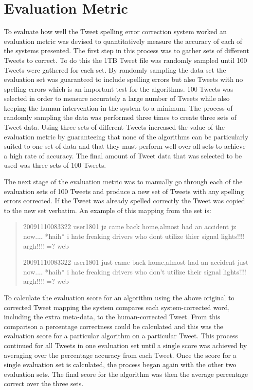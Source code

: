 \section{Evaluation Metric}

To evaluate how well the Tweet spelling error correction system worked an evaluation metric was devised to quantitatively measure the accuracy of each of the systems presented. The first step in this process was to gather sets of different Tweets to correct. To do this the 1TB Tweet file was randomly sampled until 100 Tweets were gathered for each set. By randomly sampling the data set the evaluation set was guaranteed to include spelling errors but also Tweets with no spelling errors which is an important test for the algorithms. 100 Tweets was selected in order to measure accurately a large number of Tweets while also keeping the human intervention in the system to a minimum. The process of randomly sampling the data was performed three times to create three sets of Tweet data. Using three sets of different Tweets increased the value of the evaluation metric by guaranteeing that none of the algorithms can be particularly suited to one set of data and that they must perform well over all sets to achieve a high rate of accuracy. The final amount of Tweet data that was selected to be used was three sets of 100 Tweets.

The next stage of the evaluation metric was to manually go through each of the evaluation sets of 100 Tweets and produce a new set of Tweets with any spelling errors corrected. If the Tweet was already spelled correctly the Tweet was copied to the new set verbatim. An example of this mapping from the set is:

\begin{quote}
20091110083322 user1801 jz came back home,almost had an accident jz now.... *haih* i hate freaking drivers who dont utilize thier signal lights!!!! argh!!!! =? web

20091110083322 user1801 just came back home,almost had an accident just now.... *haih* i hate freaking drivers who don't utilize their signal lights!!!! argh!!!! =? web
\end{quote}

To calculate the evaluation score for an algorithm using the above original to corrected Tweet mapping the system compares each system-corrected word, including the extra meta-data, to the human-corrected Tweet. From this comparison a percentage correctness could be calculated and this was the evaluation score for a particular algorithm on a particular Tweet. This process continued for all Tweets in one evaluation set until a single score was achieved by averaging over the percentage accuracy from each Tweet. Once the score for a single evaluation set is calculated, the process began again with the other two evaluation sets. The final score for the algorithm was then the average percentage correct over the three sets.

